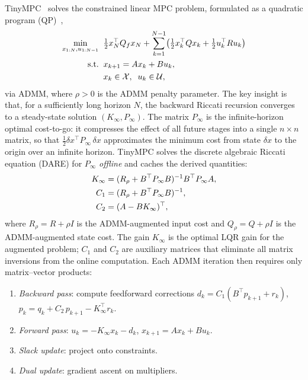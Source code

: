 \documentclass[letterpaper, 10pt, conference]{IEEEtran}
\begin{document}
TinyMPC~\cite{tinympc} solves the constrained linear MPC problem,
formulated as a quadratic program (QP)~\cite{osqp,boyd2011},
\begin{align}
  \min_{x_{1:N}, u_{1:N-1}} \;\;
  & \tfrac{1}{2} x_N^\top Q_f x_N
    + \sum_{k=1}^{N-1} \bigl(
      \tfrac{1}{2} x_k^\top Q x_k
      + \tfrac{1}{2} u_k^\top R u_k \bigr) \notag \\
  \text{s.t.} \;\;
  & x_{k+1} = A x_k + B u_k, \notag \\
  & x_k \in \mathcal{X},\;\; u_k \in \mathcal{U},
  \label{eq:mpc}
\end{align}
via ADMM, where $\rho > 0$ is the ADMM penalty parameter.
The key insight is that, for a sufficiently long horizon $N$,
the backward Riccati recursion converges to a steady-state
solution $(K_\infty, P_\infty)$.
The matrix $P_\infty$ is the infinite-horizon optimal
cost-to-go: it compresses the effect of all future stages
into a single $n \times n$ matrix, so that
$\frac{1}{2} \delta x^\top P_\infty \, \delta x$ approximates
the minimum cost from state $\delta x$ to the origin
over an infinite horizon.
TinyMPC solves the discrete algebraic Riccati equation (DARE)
for $P_\infty$ \emph{offline} and caches the derived quantities:
\begin{align}
  K_\infty &= (R_\rho + B^\top P_\infty B)^{-1} B^\top P_\infty A, \label{eq:kinf} \\
  C_1      &= (R_\rho + B^\top P_\infty B)^{-1}, \notag \\
  C_2      &= (A - B K_\infty)^\top, \notag
\end{align}
where $R_\rho = R + \rho I$ is the ADMM-augmented input cost
and $Q_\rho = Q + \rho I$ is the ADMM-augmented state cost.
The gain $K_\infty$ is the optimal LQR gain for the augmented
problem; $C_1$ and $C_2$ are auxiliary matrices that eliminate
all matrix inversions from the online computation.
Each ADMM iteration then requires only matrix--vector products:
\begin{enumerate}[label=(\roman*)]
  \item \emph{Backward pass}: compute feedforward corrections
    $d_k = C_1(B^\top p_{k+1} + r_k)$,
    $p_k = q_k + C_2 \, p_{k+1} - K_\infty^\top r_k$.
  \item \emph{Forward pass}: $u_k = -K_\infty x_k - d_k$,
    $x_{k+1} = A x_k + B u_k$.
  \item \emph{Slack update}: project onto constraints.
  \item \emph{Dual update}: gradient ascent on multipliers.
\end{enumerate}
\end{document}
